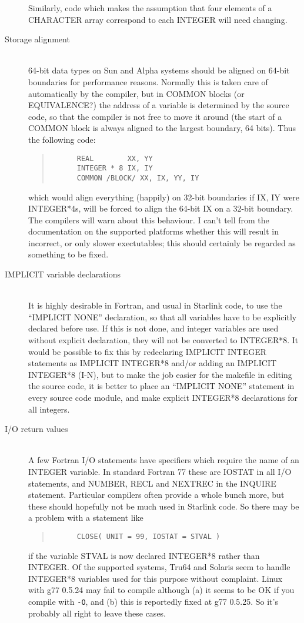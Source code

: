 \documentclass[twoside,11pt]{article}
\newcommand{\html}[1]{}
\renewcommand{\_}{\texttt{\symbol{95}}}
\newcommand{\ditem}[1]{\item[#1]\mbox{}\\}
\newenvironment{squote}{\begin{quote}\begin{small}}{\end{small}\end{quote}}
\begin{document}
\begin{description}
Similarly, code which makes the assumption that four elements of
a CHARACTER array correspond to each INTEGER will need changing.
%
\ditem{Storage alignment}
64-bit data types on Sun and Alpha systems should be aligned on 
64-bit boundaries for performance reasons.
Normally this is taken care of automatically by the compiler, 
but in COMMON blocks (or EQUIVALENCE?) the address of a 
variable is determined by the source code, so that the compiler
is not free to move it around (the start of a COMMON block is
always aligned to the largest boundary, 64 bits).
Thus the following code:
\begin{squote}
\begin{verbatim}
      REAL        XX, YY
      INTEGER * 8 IX, IY
      COMMON /BLOCK/ XX, IX, YY, IY
\end{verbatim}
\end{squote}
which would align everything (happily) on 32-bit boundaries if IX, IY
were INTEGER*4s, will be forced to align the 64-bit IX on a 32-bit
boundary.
The compilers will warn about this behaviour.
I can't tell from the documentation on the supported platforms whether
this will result in incorrect, or only slower exectutables;
this should certainly be regarded as something to be fixed.
\html{\begin{squote}\end{squote}}
%
\ditem{IMPLICIT variable declarations}
It is highly desirable in Fortran, and usual in Starlink code, to use
the ``IMPLICIT NONE'' declaration, so that all variables have to be
explicitly declared before use.
If this is not done, and integer variables are used without explicit
declaration, they will not be converted to INTEGER*8.
It would be possible to fix this by redeclaring IMPLICIT INTEGER
statements as IMPLICIT INTEGER*8 and/or adding an IMPLICIT INTEGER*8 (I-N), 
but to make the job easier for
the makefile in editing the source code, it is better to place
an ``IMPLICIT NONE'' statement in every source code module, and
make explicit INTEGER*8 declarations for all integers.
\html{\begin{squote}\end{squote}}
%
\ditem{I/O return values}
A few Fortran I/O statements have specifiers which require the name
of an INTEGER variable.  In standard Fortran 77 these are 
IOSTAT in all I/O statements, and 
NUMBER, RECL and NEXTREC in the INQUIRE statement.
Particular compilers often provide a whole bunch more, but these
should hopefully not be much used in Starlink code.
So there may be a problem with a statement like
\begin{squote}
\begin{verbatim}
      CLOSE( UNIT = 99, IOSTAT = STVAL )
\end{verbatim}
\end{squote}
if the variable STVAL is now declared INTEGER*8 rather than INTEGER.
Of the supported systems, Tru64 and Solaris seem to handle 
INTEGER*8 variables used for this purpose without complaint.
Linux with g77 0.5.24 may fail to compile although (a) it seems to
be OK if you compile with {\tt -O}, and (b) this is reportedly
fixed at g77 0.5.25.  So it's probably all right to leave these cases.
%
\end{description}
\end{document}
